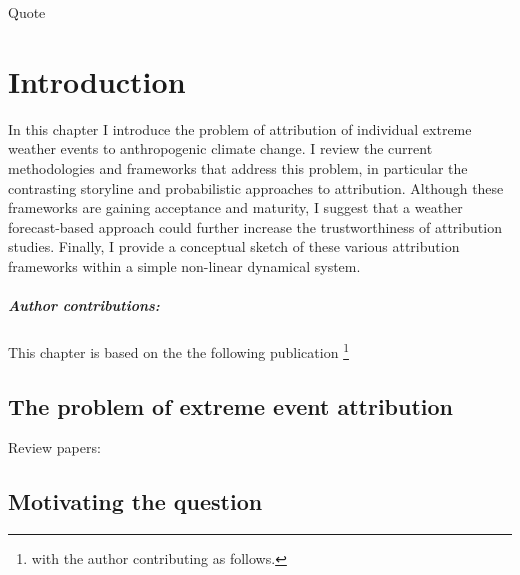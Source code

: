 \begin{savequote}[8cm]
    Quote
\end{savequote}
    
\chapter{\label{intro}Introduction} 

In this chapter I introduce the problem of attribution of individual extreme weather events to anthropogenic climate change. I review the current methodologies and frameworks that address this problem, in particular the contrasting storyline and probabilistic approaches to attribution. Although these frameworks are gaining acceptance and maturity, I suggest that a weather forecast-based approach could further increase the trustworthiness of attribution studies. Finally, I provide a conceptual sketch of these various attribution frameworks within a simple non-linear dynamical system.
\small\paragraph{Author contributions:} This chapter is based on the the following publication \footnote{with the author contributing as follows.} \par\vspace{1em}

\clearpage

\minitoc

\clearpage

\section{The problem of extreme event attribution}

  Review papers: \citep{allen_scientific_2007,stott_attribution_2013,stott_attribution_2016,otto_attribution_2016,otto_attribution_2017,swain_attributing_2020,easterling_detection_2016,noauthor_attribution_2016}

\section{Motivating the question}

